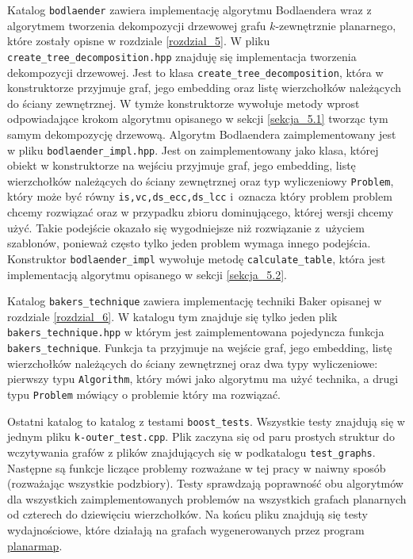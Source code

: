 \documentclass[twoside,a4paper,12pt]{report} %
\theoremstyle{break}
\begin{document}
Katalog \texttt{bodlaender} zawiera implementację algorytmu Bodlaendera wraz z algorytmem tworzenia dekompozycji drzewowej grafu $k$-zewnętrznie planarnego, które zostały opisne w rozdziale \ref{rozdzial_5}. W pliku \texttt{create\_tree\_decomposition.hpp} znajduję się implementacja tworzenia dekompozycji drzewowej. Jest to klasa \texttt{create\_tree\_decomposition}, która w konstruktorze przyjmuje graf, jego embedding oraz listę wierzchołków należących do ściany zewnętrznej. W tymże konstruktorze wywołuje metody wprost odpowiadające krokom algorytmu opisanego w sekcji \ref{sekcja_5.1} tworząc tym samym dekompozycję drzewową. Algorytm Bodlaendera zaimplementowany jest w pliku \texttt{bodlaender\_impl.hpp}. Jest on zaimplementowany jako klasa, której obiekt w konstruktorze na wejściu przyjmuje graf, jego embedding, listę wierzchołków należących do ściany zewnętrznej oraz typ wyliczeniowy \texttt{Problem}, który może być równy \texttt{is,vc,ds\_ecc,ds\_lcc} i~oznacza który problem problem chcemy rozwiązać oraz w przypadku zbioru dominującego, której wersji chcemy użyć. Takie podejście okazało się wygodniejsze niż rozwiązanie z~użyciem szablonów, ponieważ często tylko jeden problem wymaga innego podejścia. Konstruktor \texttt{bodlaender\_impl} wywołuje metodę \texttt{calculate\_table}, która jest implementacją algorytmu opisanego w sekcji \ref{sekcja_5.2}.

Katalog \texttt{bakers\_technique} zawiera implementację techniki Baker opisanej w rozdziale \ref{rozdzial_6}. W katalogu tym znajduje się tylko jeden plik \texttt{bakers\_technique.hpp} w którym jest zaimplementowana pojedyncza funkcja \texttt{bakers\_technique}. Funkcja ta przyjmuje na wejście graf, jego embedding, listę wierzchołków należących do ściany zewnętrznej oraz dwa typy wyliczeniowe: pierwszy typu \texttt{Algorithm}, który mówi jako algorytmu ma użyć technika, a drugi typu \texttt{Problem} mówiący o problemie który ma rozwiązać.

Ostatni katalog to katalog z testami \texttt{boost\_tests}. Wszystkie testy znajdują się w jednym pliku \texttt{k-outer\_test.cpp}. Plik zaczyna się od paru prostych struktur do wczytywania grafów z plików znajdujących się w podkatalogu \texttt{test\_graphs}. Następne są funkcje liczące problemy rozważane w tej pracy w naiwny sposób (rozważając wszystkie podzbiory). Testy sprawdzają poprawność obu algorytmów dla wszystkich zaimplementowanych problemów na wszystkich grafach planarnych od czterech do dziewięciu wierzchołków. Na końcu pliku znajdują się testy wydajnościowe, które działają na grafach wygenerowanych przez program \href{http://www.lix.polytechnique.fr/~schaeffe/PagesWeb/PlanarMap/index-en.html}{planarmap}.
\end{document}
